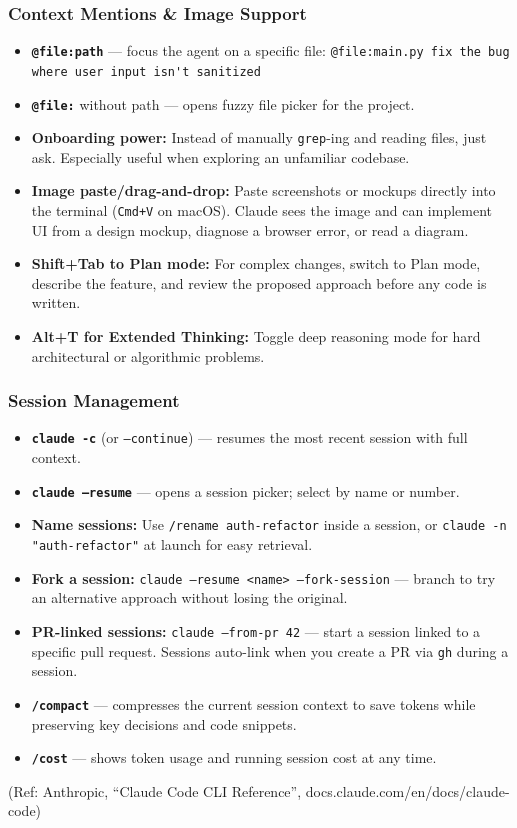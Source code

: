 \begin{frame}[fragile]\frametitle{Context Mentions \& Image Support}
  \begin{itemize}
    \item \textbf{\texttt{@file:path}} --- focus the agent on a specific file:
      \lstinline|@file:main.py fix the bug where user input isn't sanitized|
    \item \textbf{\texttt{@file:}} without path --- opens fuzzy file picker for the project.
    \item \textbf{Onboarding power:} Instead of manually \texttt{grep}-ing and reading files, just ask. Especially useful when exploring an unfamiliar codebase.
    \item \textbf{Image paste/drag-and-drop:} Paste screenshots or mockups directly into the terminal (\texttt{Cmd+V} on macOS). Claude sees the image and can implement UI from a design mockup, diagnose a browser error, or read a diagram.
    \item \textbf{Shift+Tab to Plan mode:} For complex changes, switch to Plan mode, describe the feature, and review the proposed approach before any code is written.
    \item \textbf{Alt+T for Extended Thinking:} Toggle deep reasoning mode for hard architectural or algorithmic problems.
  \end{itemize}

\end{frame}

\begin{frame}[fragile]\frametitle{Session Management}
  \begin{itemize}
    \item \textbf{\texttt{claude -c}} (or \texttt{--continue}) --- resumes the most recent session with full context.
    \item \textbf{\texttt{claude --resume}} --- opens a session picker; select by name or number.
    \item \textbf{Name sessions:} Use \texttt{/rename auth-refactor} inside a session, or \texttt{claude -n "auth-refactor"} at launch for easy retrieval.
    \item \textbf{Fork a session:} \texttt{claude --resume <name> --fork-session} --- branch to try an alternative approach without losing the original.
    \item \textbf{PR-linked sessions:} \texttt{claude --from-pr 42} --- start a session linked to a specific pull request. Sessions auto-link when you create a PR via \texttt{gh} during a session.
    \item \textbf{\texttt{/compact}} --- compresses the current session context to save tokens while preserving key decisions and code snippets.
    \item \textbf{\texttt{/cost}} --- shows token usage and running session cost at any time.
  \end{itemize}
{\tiny (Ref: Anthropic, ``Claude Code CLI Reference'', docs.claude.com/en/docs/claude-code)}
\end{frame}

